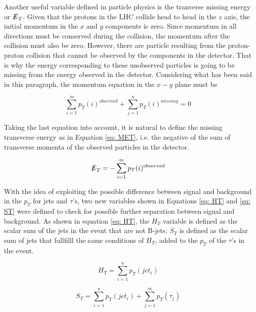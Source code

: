 Another useful variable defined in particle physics is the tranverse missing energy or $\slashed{E}_{T}$. Given that the protons in the LHC collide head to head in the $z$ axis, the initial momentum in the $x$ and $y$ components is zero. Since momentum in all directions must be conserved during the collision, the momentum after the collision must also be zero. However, there are particle resulting from the proton-proton collision that cannot be observed by the components in the detector. That is why the energy corresponding to these unobserved particles is going to be missing from the energy observed in the detector. Considering what has been said in this paragraph, the momentum equation in the $x-y$ plane must be

$$ \sum_{i=1}^{m} p_{T}(i)^{observed} + \sum_{j=1}^{n} p_{T}(i)^{missing} = 0 $$

Taking the last equation into account, it is natural to define the missing transverse energy as in Equation \ref{eq: MET}, i.e. the negative of the sum of transverse momenta of the observed particles in the detector.

\begin{equation}\label{eq: MET}
\slashed{E}_{T} = -\sum_{i=1}^{m} p_{T}(i)^{observed}
\end{equation}  



With the idea of exploiting the possible difference between signal and background in the $p_{T}$ for jets and $\tau$'s, two new variables shown in Equations \ref{eq: HT} and \ref{eq: ST} were defined to check for possible further separation between signal and background. As shown in equation \ref{eq: HT}, the $H_{T}$ variable is defined as the scalar sum of the jets in the event that are not B-jets. $S_{T}$ is defined as the scalar sum of jets that fullfilll the same conditions of $H_{T}$, added to the $p_{T}$ of the $\tau$'s in the event.


\begin{equation}
 H_{T} = \sum_{i=1}^{n} p_{T}(jet_{i})
 \label{eq: HT}
\end{equation}

\begin{equation}
 S_{T} = \sum_{i=1}^{n} p_{T}(jet_{i}) + \sum_{j=1}^{m} p_{T}(\tau_{j})
 \label{eq: ST}
\end{equation}






 




